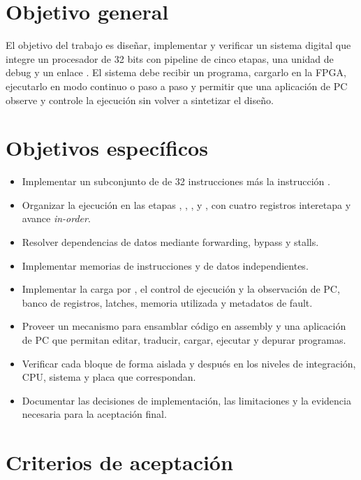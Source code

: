 \section{Objetivo general}

El objetivo del trabajo es diseñar, implementar y verificar un sistema digital
que integre un procesador  de 32 bits con pipeline de cinco etapas,
una unidad de debug y un enlace . El sistema debe recibir un
programa, cargarlo en la FPGA, ejecutarlo en modo continuo o paso a paso y
permitir que una aplicación de PC observe y controle la ejecución sin volver a
sintetizar el diseño.

\section{Objetivos específicos}

\begin{itemize}
  \item Implementar un subconjunto de  de 32 instrucciones más la
    instrucción .
  \item Organizar la ejecución en las etapas , , ,
     y , con cuatro registros interetapa y avance
    \emph{in-order}.
  \item Resolver dependencias de datos mediante forwarding, bypass y stalls.
  \item Implementar memorias de instrucciones y de datos independientes.
  \item Implementar la carga por , el control de ejecución y la
    observación de PC, banco de registros, latches, memoria utilizada y
    metadatos de fault.
  \item Proveer un mecanismo para ensamblar código en assembly y una
    aplicación de PC que permitan editar, traducir, cargar, ejecutar
    y depurar programas.
  \item Verificar cada bloque de forma aislada y después en los niveles de
    integración, CPU, sistema y placa que correspondan.
  \item Documentar las decisiones de implementación, las limitaciones y la
    evidencia necesaria para la aceptación final.
\end{itemize}

\section{Criterios de aceptación}

